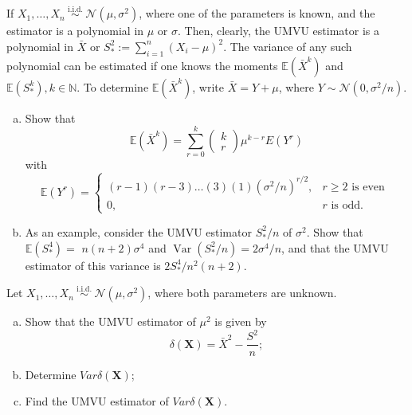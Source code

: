 \begin{exercise}
    If \(X_{1}, \ldots, X_{n} \stackrel{\text { i.i.d. }}{\sim} \mathcal{N}\left(\mu, \sigma^{2}\right)\), where one of the parameters is known, and the estimator is a polynomial in \(\mu\) or \(\sigma\). Then, clearly, the UMVU estimator is a polynomial in \(\bar{X}\) or \(S_{*}^{2}:=\sum_{i=1}^{n}\left(X_{i}-\mu\right)^{2}\). The variance of any such polynomial can be estimated if one knows the moments \(\mathbb{E}\left(\bar{X}^{k}\right)\) and \(\mathbb{E}\left(S_{*}^{k}\right), k \in \mathbb{N}\). To determine \(\mathbb{E}\left(\bar{X}^{k}\right)\), write \(\bar{X}=Y+\mu\), where \(Y \sim \mathcal{N}\left(0, \sigma^{2} / n\right) .\)
    \begin{enumerate}[(a)]
        \item Show that
        \[
        \mathbb{E}\left(\bar{X}^{k}\right)=\sum_{r=0}^{k}\left(\begin{array}{l}
        k \\
        r
        \end{array}\right) \mu^{k-r} E\left(Y^{r}\right)
        \]
        with
        \[
        \mathbb{E}\left(Y^{r}\right)=\left\{\begin{array}{cc}
        (r-1)(r-3) \ldots(3)(1)\left(\sigma^{2} / n\right)^{r / 2}, & r \geq 2 \text { is even } \\
        0, & r \text { is odd. }
        \end{array}\right.
        \]
        \item As an example, consider the UMVU estimator \(S_{*}^{2} / n\) of \(\sigma^{2}\). Show that \(\mathbb{E}\left(S_{*}^{4}\right)=\) \(n(n+2) \sigma^{4}\) and \(\operatorname{Var}\left(S_{*}^{2} / n\right)=2 \sigma^{4} / n\), and that the UMVU estimator of this variance is \(2 S_{*}^{4} / n^{2}(n+2)\).
    \end{enumerate}
\end{exercise}

\begin{solution}
    
\end{solution}

\begin{exercise}
    Let \(X_{1}, \ldots, X_{n} \stackrel{\text { i.i.d. }}{\sim} \mathcal{N}\left(\mu, \sigma^{2}\right)\), where both parameters are unknown. 
    \begin{enumerate}[(a)]
        \item Show that the UMVU estimator of \(\mu^{2}\) is given by
        \[
        \delta(\mathbf{X})=\bar{X}^{2}-\frac{S^{2}}{n}; 
        \]
        \item Determine \(Var\delta(\mathbf{X})\); 
        \item Find the UMVU estimator of \(Var \delta(\mathbf{X})\). 
    \end{enumerate}
\end{exercise}

